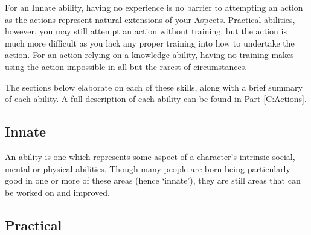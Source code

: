 For an Innate ability, having no experience is no barrier to attempting an action as the actions represent natural extensions of your Aspects. Practical abilities, however, you may still attempt an action without training, but the action is much more difficult as you lack any proper training into how to undertake the action. For an action relying on a knowledge ability, having no training makes using the action impossible in all but the rarest of circumstances.

The sections below elaborate on each of these skills, along with a brief summary of each ability. A full description of each ability can be found in Part \ref{C:Actions}.



\subsection{Innate} 

An  ability is one which represents some aspect of a character's intrinsic social, mental or physical abilities. Though many people are born being particularly good in one or more of these areas (hence `innate'), they are still areas that can be worked on and improved. 


\abilityTable
{
}


\subsection{Practical}

